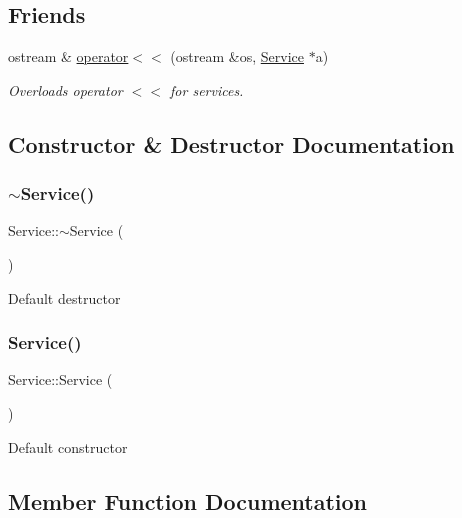 \subsection*{Friends}
\begin{DoxyCompactItemize}
\item 
ostream \& \hyperlink{class_service_a641fd7efe1dd35ea19ac062c4e2ece45}{operator$<$$<$} (ostream \&os, \hyperlink{class_service}{Service} $\ast$a)
\begin{DoxyCompactList}\small\item\em Overloads operator $<$$<$ for services. \end{DoxyCompactList}\end{DoxyCompactItemize}


\subsection{Constructor \& Destructor Documentation}
\mbox{\label{class_service_af6c3577b59652ac817d1d76aaccee904}} 
\subsubsection{\texorpdfstring{$\sim$\+Service()}{~Service()}}
{\footnotesize\ttfamily Service\+::$\sim$\+Service (\begin{DoxyParamCaption}{ }\end{DoxyParamCaption})}

Default destructor \mbox{\label{class_service_acc246c9f7ed3c51e2d91d10fe257513f}} 
\subsubsection{\texorpdfstring{Service()}{Service()}}
{\footnotesize\ttfamily Service\+::\+Service (\begin{DoxyParamCaption}{ }\end{DoxyParamCaption})}

Default constructor 

\subsection{Member Function Documentation}
\mbox{\label{class_service_a9e1aa933d52a23d5e265666bdedea0f1}} 
